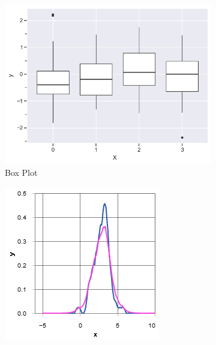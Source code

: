 \begin{figure}
    \centering
    \begin{subfigure}[b]{0.29\textwidth}
        \centering
        \includegraphics[width=\textwidth]{figures/body/methodology/norm_box.png}
        \caption{Box Plot}
        \label{figure:norm_box}
    \end{subfigure}
    \begin{subfigure}[b]{0.29\textwidth}
        \centering
        \includegraphics[width=\textwidth]{figures/body/methodology/norm_kde.png}

\end{subfigure}
\end{figure}
